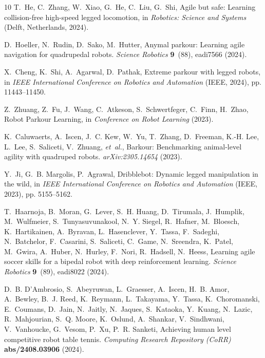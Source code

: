 \documentclass[9pt,twocolumn,twoside]{osajnl}
\begin{document}
\begin{thebibliography}{10}
    T.~{He}, C.~{Zhang}, W.~{Xiao}, G.~{He}, C.~{Liu}, G.~{Shi}, Agile but safe:
      Learning collision-free high-speed legged locomotion, in \emph{Robotics:
      Science and Systems} (Delft, Netherlands, 2024).
    
    D.~{Hoeller}, N.~{Rudin}, D.~{Sako}, M.~{Hutter}, Anymal parkour: Learning
      agile navigation for quadrupedal robots. \emph{Science Robotics}
      \textbf{9}~(88), eadi7566 (2024).
    
    X.~{Cheng}, K.~{Shi}, A.~{Agarwal}, D.~{Pathak}, Extreme parkour with legged
      robots, in \emph{IEEE International Conference on Robotics and Automation}
      (IEEE, 2024), pp. 11443--11450.
    
    Z.~{Zhuang}, Z.~{Fu}, J.~{Wang}, C.~{Atkeson}, S.~{Schwertfeger}, C.~{Finn},
      H.~{Zhao}, Robot Parkour Learning, in \emph{Conference on Robot Learning}
      (2023).
    
    K.~{Caluwaerts}, A.~{Iscen}, J.~C. {Kew}, W.~{Yu}, T.~{Zhang}, D.~{Freeman},
      K.-H. {Lee}, L.~{Lee}, S.~{Saliceti}, V.~{Zhuang}, \emph{et~al.}, Barkour:
      Benchmarking animal-level agility with quadruped robots.
      \emph{arXiv:2305.14654}  (2023).
    
    Y.~{Ji}, G.~B. {Margolis}, P.~{Agrawal}, Dribblebot: Dynamic legged
      manipulation in the wild, in \emph{IEEE International Conference on Robotics
      and Automation} (IEEE, 2023), pp. 5155--5162.
    
    T.~{Haarnoja}, B.~{Moran}, G.~{Lever}, S.~H. {Huang}, D.~{Tirumala},
      J.~{Humplik}, M.~{Wulfmeier}, S.~{Tunyasuvunakool}, N.~Y. {Siegel},
      R.~{Hafner}, M.~{Bloesch}, K.~{Hartikainen}, A.~{Byravan}, L.~{Hasenclever},
      Y.~{Tassa}, F.~{Sadeghi}, N.~{Batchelor}, F.~{Casarini}, S.~{Saliceti},
      C.~{Game}, N.~{Sreendra}, K.~{Patel}, M.~{Gwira}, A.~{Huber}, N.~{Hurley},
      F.~{Nori}, R.~{Hadsell}, N.~{Heess}, Learning agile soccer skills for a
      bipedal robot with deep reinforcement learning. \emph{Science Robotics}
      \textbf{9}~(89), eadi8022 (2024).
    
    D.~B. {D'Ambrosio}, S.~{Abeyruwan}, L.~{Graesser}, A.~{Iscen}, H.~B. {Amor},
      A.~{Bewley}, B.~J. {Reed}, K.~{Reymann}, L.~{Takayama}, Y.~{Tassa},
      K.~{Choromanski}, E.~{Coumans}, D.~{Jain}, N.~{Jaitly}, N.~{Jaques},
      S.~{Kataoka}, Y.~{Kuang}, N.~{Lazic}, R.~{Mahjourian}, S.~Q. {Moore},
      K.~{Oslund}, A.~{Shankar}, V.~{Sindhwani}, V.~{Vanhoucke}, G.~{Vesom},
      P.~{Xu}, P.~R. {Sanketi}, Achieving human level competitive robot table
      tennis. \emph{Computing Research Repository (CoRR)} \textbf{abs/2408.03906}
      (2024).
    

\end{thebibliography}
\end{document}
